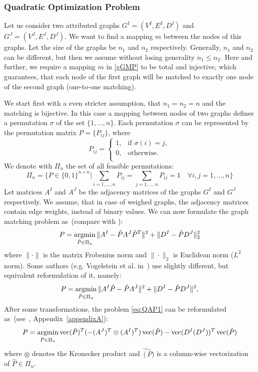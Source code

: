 \subsubsection{Quadratic Optimization Problem}
Let us consider two attributed graphs $G^I = (V^I, E^I,D^I)$ and $G^J = (V^J, E^J,D^J)$. We want to find a mapping $m$ between the nodes of this graphs. Let the size of the graphs be $n_1$ and $n_2$ respectively. Generally, $n_1$ and $n_2$ can be different, but then we assume without losing generality $n_1\le n_2$. Here and further, we require a mapping $m$ in \eqref{gGMP} to be total and injective, which guarantees, that each node of the first graph will be matched to exactly one node of the second graph (one-to-one matching). 

We start first with a even stricter assumption, that $n_1=n_2=n$ and the matching is bijective. In this case a mapping between nodes of two graphs defines a permutation $\sigma$ of the set $\{1,\dots,n\}$. Each permutation $\sigma$ can be represented by the permutation matrix $P=\{P_{ij}\}$, where
\begin{equation*}
P_{ij}=\begin{cases}
 1, & \text{if } \sigma(i)=j, \\
 0, & \text{otherwise.} \\
\end{cases}
\end{equation*}
We denote with $\Pi_n$ the set of all feasible permutations:
\begin{equation*}
\Pi_n=\{P\in\{0,1\}^{n\times n}|\sum_{i=1,\dots,n}P_{ij}=\sum_{j=1,\dots,n}P_{ij}=1\quad\forall i,j=1,\dots,n\}
\end{equation*}
Let matrices $A^I$ and $A^J$ be the adjacency matrices of the graphs $G^I$ and $G^J$ respectively. We assume, that in case of weighed graphs, the adjacency matrices contain edge weights, instead of binary values. We can now formulate the graph matching problem as~(compare with \cite{Herault1990_SimulatedAnnealing,FastPFP,Lyzinski2015,Roth2001,Umeyam1988,Zazlavskiy2008_PATH}):
\begin{equation} \label{eq:QAP1}
P = \mathop{\rm argmin}_{\hat{P}\in\Pi_n}\|A^I-\hat{P}A^J\hat{P}^T\|^2+\|D^I-\hat{P}D^J\|^2_2
\end{equation}
where $\|\cdot\|$ is the matrix Frobenius norm and $\|\cdot\|_2$ is Euclidean norm ($L^2$ norm). Some authors (e.g. Vogelstein et al. in~\cite{Vogelstein_BrainGraphs}) use slightly different, but equivalent reformulation of it, namely:
\begin{equation} \label{eq:QAP2}
P = \mathop{\rm argmin}_{\hat{P}\in\Pi_n}\|A^I\hat{P}-\hat{P}A^J\|^2+\|D^I-\hat{P}D^J\|^2,
\end{equation}
After some transformations, the problem \eqref{eq:QAP1} can be reformulated as~(see~\cite{Burkard98thequadratic}, Appendix~\ref{appendixA}):
\begin{equation} \label{eq:QAP3}
P = \mathop{\rm argmin}_{\hat{P}\in\Pi_n}\mathop{\rm vec}(\hat{P})^T(-(A^J)^T\otimes(A^I)^T)\mathop{\rm vec}(\hat{P})-\mathop{\rm vec}(D^I(D^J))^T\mathop{\rm vec}(\hat{P})
\end{equation}
where $\otimes$ denotes the Kronecker product and $\vec(\hat{P})$ is a column-wise vectorization of $\hat{P}\in\Pi_n$.

